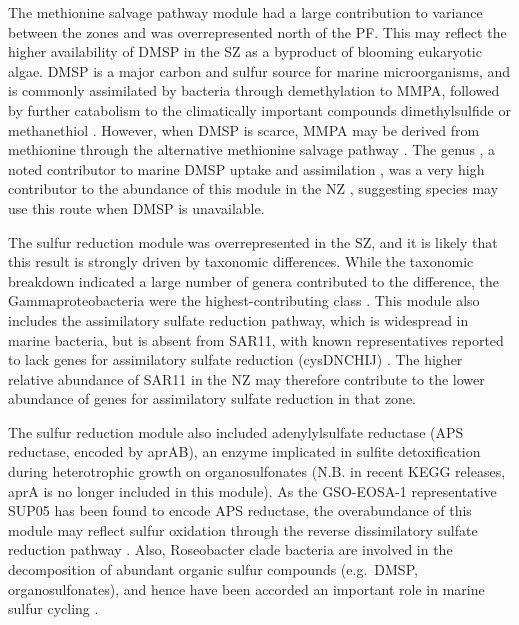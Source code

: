 The methionine salvage pathway module had a large contribution to variance between the zones and was overrepresented north of the \ac{PF}.
This may reflect the higher availability of \ac{DMSP} in the \ac{SZ} as a byproduct of blooming eukaryotic algae.
\ac{DMSP} is a major carbon and sulfur source for marine microorganisms, and is commonly assimilated by bacteria through demethylation to \ac{MMPA}, followed by further catabolism to the climatically important compounds dimethylsulfide or methanethiol \citep[review in][]{Curson:2011ic}.
However, when \ac{DMSP} is scarce, \ac{MMPA} may be derived from methionine through the alternative methionine salvage pathway \cite{Reisch:2012bb}.
The genus , a noted contributor to marine \ac{DMSP} uptake and assimilation \cite{VilaCosta:2006gt}, was a very high contributor to the abundance of this module in the \ac{NZ} , suggesting  species may use this route when \ac{DMSP} is unavailable.

The sulfur reduction module was overrepresented in the \ac{SZ}, and it is likely that this result is strongly driven by taxonomic differences.
While the taxonomic breakdown indicated a large number of genera contributed to the difference, the Gammaproteobacteria were the highest-contributing class .
This module also includes the assimilatory sulfate reduction pathway, which is widespread in marine bacteria, but is absent from SAR11, with known representatives reported to lack genes for assimilatory sulfate reduction (cysDNCHIJ) \cite{Tripp:2008dd}.
The higher relative abundance of SAR11 in the \ac{NZ} may therefore contribute to the lower abundance of genes for assimilatory sulfate reduction in that zone. 

The sulfur reduction module also included adenylylsulfate reductase (APS reductase, encoded by aprAB), an enzyme implicated in sulfite detoxification during heterotrophic growth on organosulfonates \cite{Meyer:2007jd} (N.B. in recent \ac{KEGG} releases, aprA is no longer included in this module).
As the GSO-EOSA-1 representative SUP05 has been found to encode APS reductase, the overabundance of this module may reflect sulfur oxidation through the reverse dissimilatory sulfate reduction pathway \cite{Walsh:2009fja}.
Also, Roseobacter clade bacteria are involved in the decomposition of abundant organic sulfur compounds (e.g.\ \ac{DMSP}, organosulfonates), and hence have been accorded an important role in marine sulfur cycling \cite{Moran:2007fs}.

